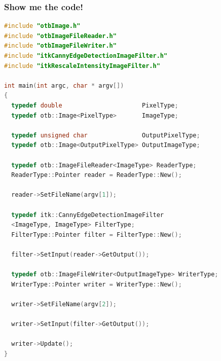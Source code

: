 \documentclass[8pt]{beamer}
\begin{document}
\begin{frame}[fragile]
\frametitle{Show me the code!}
\begin{lstlisting}[language=c++,breaklines=true,breakatwhitespace=true,frame = tb,framerule = 0.25pt,fontadjust,backgroundcolor={\color{listlightgray}},basicstyle = {\ttfamily\tiny},keywordstyle = {\ttfamily\color{listkeyword}\textbf},identifierstyle = {\ttfamily},commentstyle = {\ttfamily\color{listcomment}\textit},stringstyle = {\ttfamily},showstringspaces = false,showtabs = false,numbers = none,numbersep = 2pt, numberstyle={\ttfamily\color{listnumbers}},tabsize = 2]
#include "otbImage.h"
#include "otbImageFileReader.h"
#include "otbImageFileWriter.h"
#include "itkCannyEdgeDetectionImageFilter.h"
#include "itkRescaleIntensityImageFilter.h"

int main(int argc, char * argv[])
{
  typedef double                      PixelType;
  typedef otb::Image<PixelType>       ImageType;

  typedef unsigned char               OutputPixelType;
  typedef otb::Image<OutputPixelType> OutputImageType;

  typedef otb::ImageFileReader<ImageType> ReaderType;
  ReaderType::Pointer reader = ReaderType::New();

  reader->SetFileName(argv[1]);

  typedef itk::CannyEdgeDetectionImageFilter
  <ImageType, ImageType> FilterType;
  FilterType::Pointer filter = FilterType::New();

  filter->SetInput(reader->GetOutput());

  typedef otb::ImageFileWriter<OutputImageType> WriterType;
  WriterType::Pointer writer = WriterType::New();

  writer->SetFileName(argv[2]);

  writer->SetInput(filter->GetOutput());

  writer->Update();
}
\end{lstlisting}
\end{frame}
\end{document}
